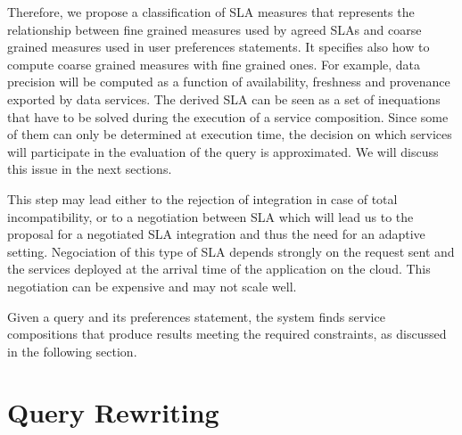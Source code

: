 Therefore, we propose a classification of SLA measures that represents the relationship between fine grained measures used by agreed SLAs and coarse grained measures used in user preferences statements. It specifies also how to compute coarse grained measures with fine grained ones. For example, data precision will be computed as a function of availability, freshness and provenance exported by data services. The derived SLA  can be seen as a set of inequations that have to be solved during the execution of a service composition. Since some of them can only be determined at execution time, the decision on which services will participate in the evaluation of the query is approximated. We will discuss this issue in the next sections.


This step may lead either to the rejection of integration in case of total incompatibility, or to a negotiation between SLA which will lead us to the proposal for a negotiated SLA integration and thus the need for an adaptive setting.
%
%
%
 Negociation of this type of SLA depends strongly on the request sent and the services deployed at the arrival time of the application on the cloud. This negotiation can be expensive and may not scale well.


 
 
 Given a query and its preferences statement, the system  finds  service compositions that produce results   meeting the required constraints, as discussed in the following section.
 
\section{Query Rewriting}
\label{sec:queryRew}

